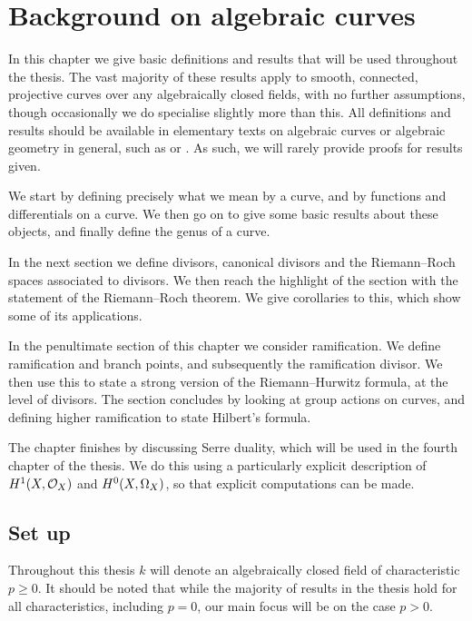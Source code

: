 \chapter{Background on algebraic curves}\label{chapterbackground}

In this chapter we give basic definitions and results that will be used throughout the thesis.
The vast majority of these results apply to smooth, connected, projective curves over any algebraically closed fields, with no further assumptions, though occasionally we do specialise slightly more than this.
All definitions and results should be available in elementary texts on algebraic curves or algebraic geometry in general, such as \cite{fulton} or \cite{hart} .
As such, we will rarely provide proofs for results given.

We start by defining precisely what we mean by a curve, and by functions and differentials on a curve.
We then go on to give some basic results about these objects, and finally define the genus of a curve.

In the next section we define divisors, canonical divisors and the Riemann--Roch spaces associated to divisors.
We then reach the highlight of the section with the statement of the Riemann--Roch theorem.
We give corollaries to this, which show some of its applications.

In the penultimate section of this chapter we consider ramification.
We define ramification and branch points, and subsequently the ramification divisor.
We then use this to state a strong version of the Riemann--Hurwitz formula, at the level of divisors.
The section concludes by looking at group actions on curves, and defining higher ramification to state Hilbert's formula.

The chapter finishes by discussing Serre duality, which will be used in the fourth chapter of the thesis.
We do this using a particularly explicit description of $H^1(X,\mathcal{O}_X)$ and ${H^0(X,\Omega_X)}$, so that explicit computations can be made.


\section{Set up}

Throughout this thesis $k$ will denote an algebraically closed field of characteristic $p \geq 0$.
It should be noted that while the majority of results in the thesis hold for all characteristics, including $p=0$, our main focus will be on the case $p > 0$.

